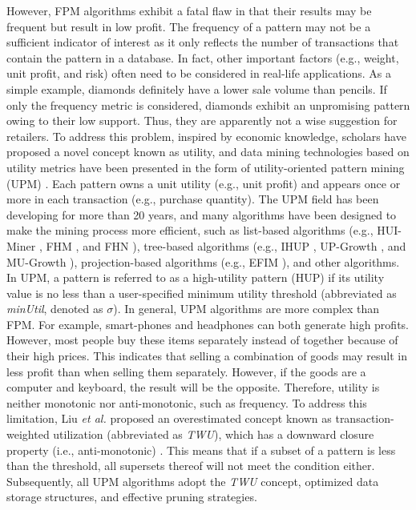 \documentclass[journal]{IEEEtran}
\begin{document}
However, FPM algorithms exhibit a fatal flaw in that their results may be frequent but result in low profit. The frequency of a pattern may not be a sufficient indicator of interest as it only reflects the number of transactions that contain the pattern in a database. In fact, other important factors (e.g., weight, unit profit, and risk) often need to be considered in real-life applications. As a simple example, diamonds definitely have a lower sale volume than pencils. If only the frequency metric is considered, diamonds exhibit an unpromising pattern owing to their low support. Thus, they are apparently not a wise suggestion for retailers. To address this problem, inspired by economic knowledge, scholars have proposed a novel concept known as utility, and data mining technologies based on utility metrics have been presented in the form of utility-oriented pattern mining (UPM) \cite{gan2021survey}. Each pattern owns a unit utility (e.g., unit profit) and appears once or more in each transaction (e.g., purchase quantity). The UPM field has been developing for more than 20 years, and many algorithms have been designed to make the mining process more efficient, such as list-based algorithms (e.g., HUI-Miner \cite{liu2012mining}, FHM \cite{fournier2014fhm}, and FHN \cite{lin2016fhn}), tree-based algorithms (e.g., IHUP \cite{ahmed2009efficient}, UP-Growth \cite{tseng2012efficient}, and MU-Growth \cite{yun2014high}), projection-based algorithms (e.g., EFIM \cite{zida2017efim}), and other algorithms. In UPM, a pattern is referred to as a high-utility pattern (HUP) if its utility value is no less than a user-specified minimum utility threshold (abbreviated as \textit{minUtil}, denoted as $\sigma$). In general, UPM algorithms are more complex than FPM. For example, smart-phones and headphones can both generate high profits. However, most people buy these items separately instead of together because of their high prices. This indicates that selling a combination of goods may result in less profit than when selling them separately. However, if the goods are a computer and keyboard, the result will be the opposite. Therefore, utility is neither monotonic nor anti-monotonic, such as frequency. To address this limitation, Liu \textit{et al.} \cite{liu2005two} proposed an overestimated concept known as transaction-weighted utilization (abbreviated as \textit{TWU}), which has a downward closure property (i.e., anti-monotonic) \cite{agrawal1994fast}. This means that if a subset of a pattern is less than the threshold, all supersets thereof will not meet the condition either. Subsequently, all UPM algorithms adopt the \textit{TWU} concept, optimized data storage structures, and effective pruning strategies.
\end{document}
